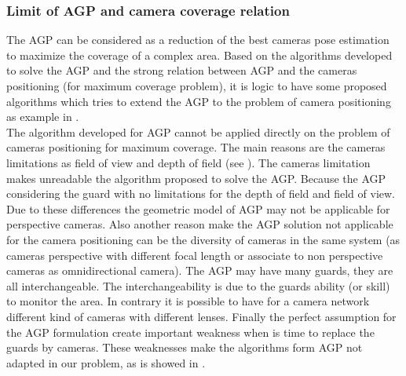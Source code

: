
	
	\subsubsection{Limit of AGP and camera coverage relation}

The AGP can be considered as a reduction of the best cameras pose estimation to maximize the coverage of a complex area. Based on the algorithms developed to solve the AGP and the strong relation between AGP and the cameras positioning (for maximum coverage problem), it is logic to have some proposed algorithms which tries to extend the AGP to the  problem of camera positioning as example in \cite{221*fleishman2000,33*reddy2012,43*erdem2006}.\\
The algorithm developed for AGP cannot be applied directly on the problem of cameras positioning for maximum coverage. The main reasons are the cameras limitations as field of view and depth of field (see \cite{82*chrysostomou2012,170*yabuta2008}). The cameras limitation makes  unreadable the algorithm proposed to solve the AGP.
 Because the AGP considering the guard with no limitations for the depth of field and field of view. Due to these differences the geometric model of AGP may not be applicable for perspective cameras.
Also another reason make the AGP solution not applicable for the camera positioning can be the diversity of cameras in the same system (as cameras perspective with different focal length or associate to non perspective cameras as omnidirectional camera).
 The AGP may have many guards, they are all interchangeable. The interchangeability is due to the guards ability (or skill) to monitor the area. In contrary it is possible to have for a camera network different kind of cameras with different lenses. 
Finally the  perfect assumption for the AGP formulation create important weakness when is time to replace the guards by cameras. These weaknesses make the algorithms form AGP not adapted in our problem, as is showed in \cite{81*nikolaidis2009,171*horster2006}.

